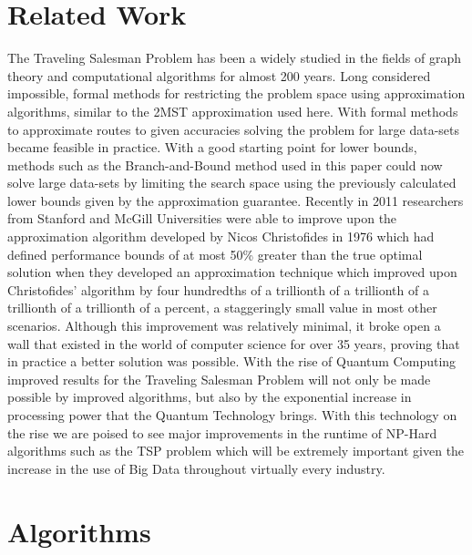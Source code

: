 \documentclass[format=sigconf]{acmart}
\begin{document}
\section{Related Work}
The Traveling Salesman Problem has been a widely studied in the fields of graph theory and computational 
algorithms for almost 200 years. Long considered impossible, formal methods for restricting the problem space using 
approximation algorithms, similar to the 2MST approximation used here. With formal methods to approximate routes to given accuracies solving the problem 
for large data-sets became feasible in practice. With a good starting point for lower bounds, methods such as the Branch-and-Bound method used in this paper 
could now solve large data-sets by limiting the search space using the previously calculated lower bounds given by the approximation guarantee. Recently in 2011 
researchers from Stanford and McGill Universities were able to improve upon the approximation algorithm developed by Nicos Christofides 
in 1976 which had defined performance bounds of at most 50\% greater than the true optimal solution when they developed an approximation technique 
which improved upon Christofides' algorithm by four hundredths of a trillionth of a trillionth of a trillionth of a trillionth of a percent, a staggeringly small 
value in most other scenarios. Although this improvement was relatively minimal, it broke open a wall that existed in the world of computer science for over 35 years, proving 
that in practice a better solution was possible. With the rise of Quantum Computing improved results for the Traveling Salesman Problem will not only be made possible by improved algorithms, 
but also by the exponential increase in processing power that the Quantum Technology brings. With this technology on the rise we are poised to see major improvements in the runtime of NP-Hard algorithms such as the TSP 
problem which will be extremely important given the increase in the use of Big Data throughout virtually every industry. \cite{CS_Sci}
\section{Algorithms}
\end{document}

